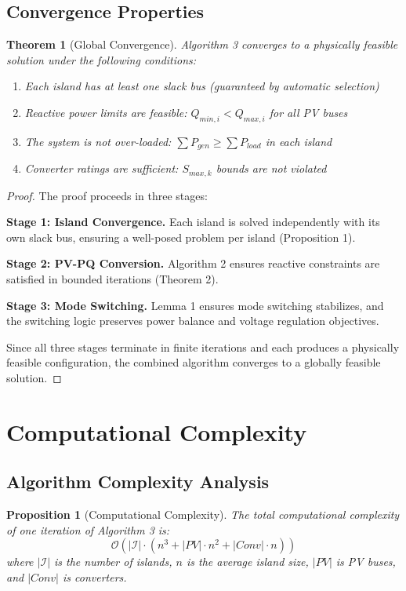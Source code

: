 \documentclass[11pt]{article}
\newtheorem{theorem}{Theorem}
\newtheorem{proposition}{Proposition}
\begin{document}
\subsection{Convergence Properties}

\begin{theorem}[Global Convergence]
Algorithm 3 converges to a physically feasible solution under the following conditions:
\begin{enumerate}
    \item Each island has at least one slack bus (guaranteed by automatic selection)
    \item Reactive power limits are feasible: $Q_{min,i} < Q_{max,i}$ for all PV buses
    \item The system is not over-loaded: $\sum P_{gen} \geq \sum P_{load}$ in each island
    \item Converter ratings are sufficient: $S_{max,k}$ bounds are not violated
\end{enumerate}
\end{theorem}

\begin{proof}
The proof proceeds in three stages:

\textbf{Stage 1: Island Convergence.} Each island is solved independently with its own slack bus, ensuring a well-posed problem per island (Proposition 1).

\textbf{Stage 2: PV-PQ Conversion.} Algorithm 2 ensures reactive constraints are satisfied in bounded iterations (Theorem 2).

\textbf{Stage 3: Mode Switching.} Lemma 1 ensures mode switching stabilizes, and the switching logic preserves power balance and voltage regulation objectives.

Since all three stages terminate in finite iterations and each produces a physically feasible configuration, the combined algorithm converges to a globally feasible solution.
\end{proof}

\section{Computational Complexity}

\subsection{Algorithm Complexity Analysis}

\begin{proposition}[Computational Complexity]
The total computational complexity of one iteration of Algorithm 3 is:
\begin{equation}
\mathcal{O}(|\mathcal{I}| \cdot (n^3 + |PV| \cdot n^2 + |Conv| \cdot n))
\end{equation}
where $|\mathcal{I}|$ is the number of islands, $n$ is the average island size, $|PV|$ is PV buses, and $|Conv|$ is converters.
\end{proposition}
\end{document}
